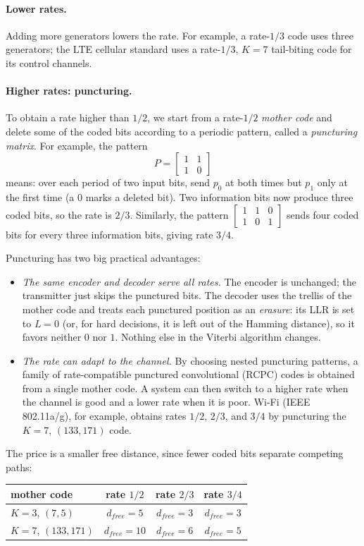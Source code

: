 \paragraph{Lower rates.} Adding more generators lowers the rate. For example, a rate-\(1/3\) code uses three generators; the LTE cellular standard uses a rate-\(1/3\), \(K = 7\) tail-biting code for its control channels.

\paragraph{Higher rates: puncturing.} To obtain a rate higher than \(1/2\), we start from a rate-\(1/2\) \emph{mother code} and delete some of the coded bits according to a periodic pattern, called a \emph{puncturing matrix}. For example, the pattern
\[P = \begin{bmatrix} 1 & 1 \\ 1 & 0 \end{bmatrix}\]
means: over each period of two input bits, send \(p_0\) at both times but \(p_1\) only at the first time (a \(0\) marks a deleted bit). Two information bits now produce three coded bits, so the rate is \(2/3\). Similarly, the pattern \(\begin{bmatrix} 1 & 1 & 0 \\ 1 & 0 & 1 \end{bmatrix}\) sends four coded bits for every three information bits, giving rate \(3/4\).

Puncturing has two big practical advantages:
\begin{itemize}
    \item \emph{The same encoder and decoder serve all rates.} The encoder is unchanged; the transmitter just skips the punctured bits. The decoder uses the trellis of the mother code and treats each punctured position as an \emph{erasure}: its LLR is set to \(L = 0\) (or, for hard decisions, it is left out of the Hamming distance), so it favors neither \(0\) nor \(1\). Nothing else in the Viterbi algorithm changes.
    \item \emph{The rate can adapt to the channel.} By choosing nested puncturing patterns, a family of rate-compatible punctured convolutional (RCPC) codes is obtained from a single mother code. A system can then switch to a higher rate when the channel is good and a lower rate when it is poor. Wi-Fi (IEEE 802.11a/g), for example, obtains rates \(1/2\), \(2/3\), and \(3/4\) by puncturing the \(K=7\), \((133,171)\) code.
\end{itemize}
The price is a smaller free distance, since fewer coded bits separate competing paths:
\begin{center}
\begin{tabular}{lccc}
\hline
mother code & rate \(1/2\) & rate \(2/3\) & rate \(3/4\) \\
\hline
\(K=3\), \((7,5)\) & \(d_{free} = 5\) & \(d_{free} = 3\) & \(d_{free} = 3\) \\
\(K=7\), \((133,171)\) & \(d_{free} = 10\) & \(d_{free} = 6\) & \(d_{free} = 5\) \\
\hline
\end{tabular}
\end{center}

